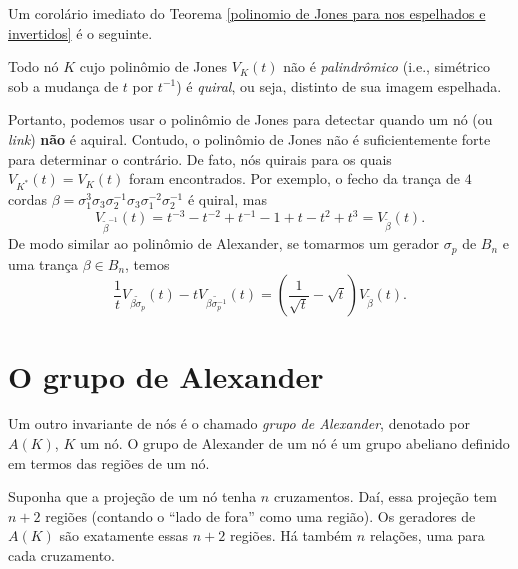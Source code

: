 	Um corolário imediato do Teorema \ref{polinomio de Jones para nos espelhados e invertidos} é o seguinte.
	\begin{corollary}
	\label{simetria polinomio de Jones}
		Todo nó $K$ cujo polinômio de Jones $V_K(t)$ não é \textit{palindrômico} 
		(i.e., simétrico sob a mudança de $t$ por $t^{-1}$) é \textit{quiral}, ou seja, 
		distinto de sua imagem espelhada.
	\end{corollary}
	Portanto, podemos usar o polinômio de Jones para detectar quando um nó (ou \textit{link}) 
	\textbf{não} é aquiral. Contudo, o polinômio de Jones não é suficientemente forte para 
	determinar o contrário. De fato, nós quirais para os quais $V_{K^\ast}(t) = V_K(t)$ foram 
	encontrados. Por exemplo, o fecho da trança de $4$ cordas 
	$\beta = \sigma_1^3\sigma_3\sigma_2^{-1}\sigma_3\sigma_1^{-2}\sigma_2^{-1}$ é quiral, mas 
	\begin{equation*}
	    V_{\widetilde{\beta}^{-1}}(t) = t^{-3} - t^{-2} + t^{-1} - 1 + t - t^2 + t^3 = V_{\widetilde{\beta}}(t).
	\end{equation*}
	De modo similar ao polinômio de Alexander, se tomarmos um gerador $\sigma_p$ de $B_n$ e uma 
	trança $\beta\in B_n$, temos
	\begin{equation*}
	    \frac{1}{t}V_{\widetilde{\beta\sigma_p}}(t) - tV_{\widetilde{\beta\sigma_p^{-1}}}(t) 
	    = \left( \frac{1}{\sqrt{t}} - \sqrt{t}\right)V_{\widetilde{\beta}}(t).
	\end{equation*}
	\section{O grupo de Alexander}
	Um outro invariante de nós é o chamado \textit{grupo de Alexander}, denotado por $A(K)$, 
	$K$ um nó. O grupo de Alexander de um nó é um grupo abeliano definido em termos das regiões de um nó.
	
	\par\vspace{0.3cm} Suponha que a projeção de um nó tenha $n$ cruzamentos. Daí, essa projeção 
	tem $n+2$ regiões (contando o ``lado de fora'' como uma região). Os geradores de $A(K)$ são 
	exatamente essas $n+2$ regiões. Há também $n$ relações, uma para cada cruzamento.
	

